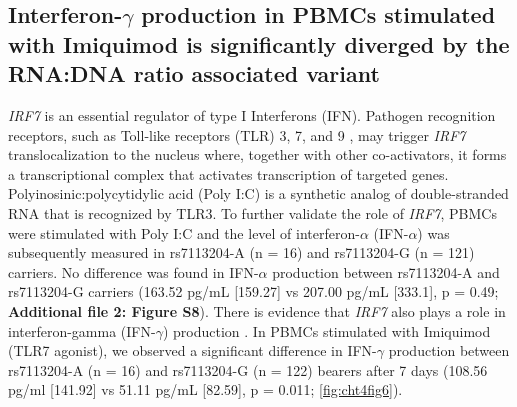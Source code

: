 \documentclass{book}
\begin{document}
\begin{refsection}
\subsection*{Interferon-$\gamma$ production in PBMCs stimulated with Imiquimod is significantly diverged by the RNA:DNA ratio associated variant}
\textit{IRF7} is an essential regulator of type I Interferons (IFN).
Pathogen recognition receptors, such as Toll-like receptors (TLR) 3, 7, and 9 \cite{Ning2011IRF7}, may trigger \textit{IRF7} translocalization to the nucleus where, together with other co-activators, it forms a transcriptional complex that activates transcription of targeted genes.
Polyinosinic:polycytidylic acid (Poly I:C) is a synthetic analog of double-stranded RNA that is recognized by TLR3.
To further validate the role of \textit{IRF7}, PBMCs were stimulated with Poly I:C and the level of interferon-$\alpha$ (IFN-$\alpha$) was subsequently measured in rs7113204-A (n = 16) and rs7113204-G (n = 121) carriers.
No difference was found in IFN-$\alpha$ production between rs7113204-A and rs7113204-G carriers (163.52 pg/mL [159.27] vs 207.00 pg/mL [333.1], p = 0.49; \textbf{Additional file 2: Figure S8}).
There is evidence that \textit{IRF7} also plays a role in interferon-gamma (IFN-$\gamma$) production \cite{Johnson2020Interferon,Steinberg2009The}.
In PBMCs stimulated with Imiquimod (TLR7 agonist), we observed a significant difference in IFN-$\gamma$ production between rs7113204-A (n = 16) and rs7113204-G (n = 122) bearers after 7 days (108.56 pg/ml [141.92] vs 51.11 pg/mL [82.59], p = 0.011; \ref{fig:cht4fig6}).


\end{refsection}
\end{document}
